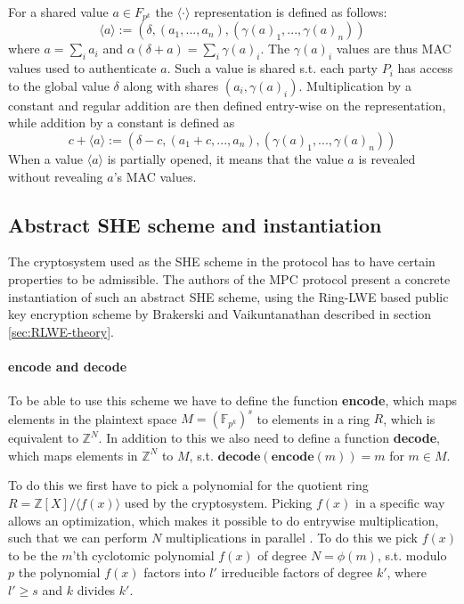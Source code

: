\documentclass[../main.tex]{subfiles}
\begin{document}
For a shared value $a \in F_{p^k}$ the $\langle \cdot \rangle$ representation is defined as follows:
$$\langle a \rangle := (\delta, (a_1, ..., a_n), (\gamma(a)_1, ..., \gamma(a)_n))$$
where $a = \sum_i a_i$ and $\alpha (\delta + a) = \sum_i \gamma(a)_i$. The $\gamma(a)_i$ values are thus MAC values used to authenticate $a$. Such a value is shared s.t. each party $P_i$ has access to the global value $\delta$ along with shares $(a_i, \gamma(a)_i)$. Multiplication by a constant and regular addition are then defined entry-wise on the representation, while addition by a constant is defined as $$c + \langle a \rangle := (\delta - c, (a_1 + c, ..., a_n), (\gamma(a)_1, ..., \gamma(a)_n))$$
When a value $\langle a \rangle$ is partially opened, it means that the value $a$ is revealed without revealing $a$'s MAC values.

\subsection{Abstract SHE scheme and instantiation} \label{sec:abstract-she-theory}

The cryptosystem used as the SHE scheme in the protocol has to have certain properties to be admissible. The authors of the MPC protocol present a concrete instantiation of such an abstract SHE scheme, using the Ring-LWE based public key encryption scheme by Brakerski and Vaikuntanathan \cite{brakerski2011fully} described in section \ref{sec:RLWE-theory}.

\paragraph{encode and decode}
To be able to use this scheme we have to define the function \textbf{encode}, which maps elements in the plaintext space $M = (\mathbb{F}_{p^k})^s$ to elements in a ring $R$, which is equivalent to $\mathbb{Z}^N$. In addition to this we also need to define a function \textbf{decode}, which maps elements in $\mathbb{Z}^N$ to $M$, s.t. $\textbf{decode}(\textbf{encode}(m)) = m$ for $m \in M$.

To do this we first have to pick a polynomial for the quotient ring $R = \mathbb{Z}[X]/\langle f(x) \rangle$ used by the cryptosystem. Picking $f(x)$ in a specific way allows an optimization, which makes it possible to do entrywise multiplication, such that we can perform $N$ multiplications in parallel \cite{damgaard2012multiparty}.
To do this we pick $f(x)$ to be the $m$'th cyclotomic polynomial $f(x)$ of degree $N = \phi(m)$, s.t. modulo $p$ the polynomial $f(x)$ factors into $l'$ irreducible factors of degree $k'$, where $l' \geq s$ and $k$ divides $k'$.
\end{document}
